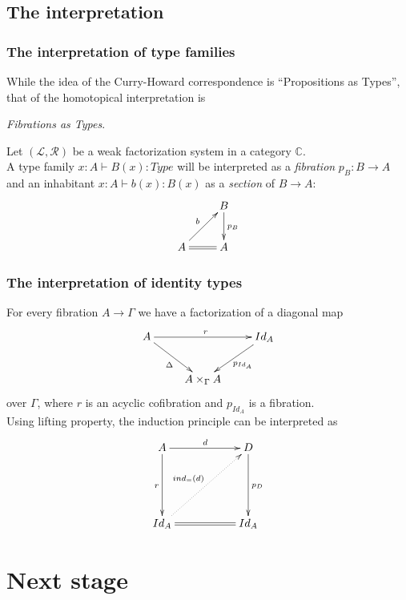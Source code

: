 \documentclass[dvipdfmx]{beamer}
\begin{document}
\subsection{The interpretation}

\begin{frame}
  \frametitle{The interpretation of type families}
  While the idea of the Curry-Howard correspondence is
  ``Propositions as Types'',
  that of the homotopical interpretation is
  \pause
  \begin{center}
    {\it Fibrations as Types}.
  \end{center}
  \pause
  Let $\left( {\mathcal L} , {\mathcal R} \right)$
  be a weak factorization system in a category ${\mathbb C}$.
  \\
  A type family $x : A \vdash B \left( x \right) : Type$
  will be interpreted as a {\it fibration} $p_{B} : B \to A$
  and an inhabitant
  $x : A \vdash b \left( x \right) : B \left( x \right)$
  as a {\it section} of
  $B \to A$:
  \[
    \xymatrix{
      & B \ar[d]^{p_{B}}
      \\
      A \ar@{=}[r] \ar[ur]^{b}
      & A
    }
  \]
\end{frame}

\begin{frame}
  \frametitle{The interpretation of identity types}
  For every fibration $A \to \Gamma$
  we have a factorization of a diagonal map
  \[
    \xymatrix{
      A \ar[rr]^{r} \ar[dr]_{\Delta}
      &
      & Id_{A} \ar[dl]^{p_{Id_A}}
      \\
      & A \times _{\Gamma}  A
      &
    }
  \]
  over $\Gamma$, where $r$ is an acyclic cofibration
  and $p_{Id_A}$ is a fibration.
  \pause
  \\
  Using lifting property,
  the induction principle can be interpreted as
  \[
    \xymatrix{
      A \ar[rr]^{d} \ar[dd]_{r}
      &
      & D \ar[dd]^{p_{D}}
      \\
      & & \\
      Id_{A} \ar@{=}[rr] \ar@{.>}[urur]^{ind_{=} \left( d \right)}
      &
      & Id_{A}
    }
  \]
\end{frame}

\section{Next stage}
\end{document}
